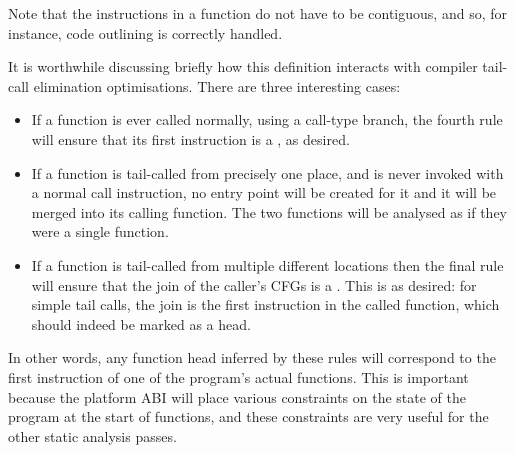 Note that the instructions in a function do not have to be contiguous,
and so, for instance, code outlining is correctly
handled.

It is worthwhile discussing briefly how this definition interacts with
compiler tail-call elimination optimisations.  There are three
interesting cases:

\begin{itemize}
\item
  If a function is ever called normally, using a call-type branch, the
  fourth rule will ensure that its first instruction is a
  , as desired.
\item
  If a function is tail-called from precisely one place, and is never
  invoked with a normal call instruction, no entry point will be
  created for it and it will be merged into its calling function.  The
  two functions will be analysed as if they were a single function.
\item
  If a function is tail-called from multiple different locations then
  the final rule will ensure that the join of the caller's CFGs is a
  .  This is as desired: for simple tail calls,
  the join is the first instruction in the called function, which should
  indeed be marked as a head.
\end{itemize}

In other words, any function head inferred by these rules will
correspond to the first instruction of one of the program's actual
functions.  This is important because the platform ABI will place
various constraints on the state of the program at the start of
functions, and these constraints are very useful for the other static
analysis passes.


